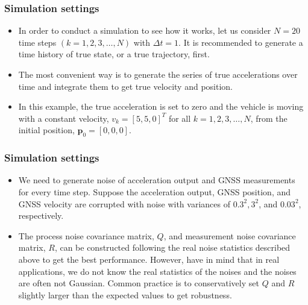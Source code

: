 \documentclass{beamer}
\begin{document}
\begin{frame}
	\frametitle{Simulation settings}
	\begin{itemize}
		\item  In order to conduct a simulation to see how it works, let us consider $N=20$ time steps $(k=1,2,3, \ldots, N)$ with $\Delta t=1$. It is recommended to generate a time history of true state, or a true trajectory, first. 
		\item The most convenient way is to generate the series of true accelerations over time and integrate them to get true velocity and position.
		\item  In this example, the true acceleration is set to zero and the vehicle is moving with a constant velocity, $v_k=[5,5,0]^T$ for all $k=1,2,3, \ldots, N$, from the initial position, $\boldsymbol{p}_0=[0,0,0]$. 
	
	\end{itemize}
\end{frame}

\begin{frame}
	\frametitle{Simulation settings}
	\begin{itemize}
		\item  We need to generate noise of acceleration output and GNSS measurements for every time step. Suppose the acceleration output, GNSS position, and GNSS velocity are corrupted with noise with variances of $0.3^2, 3^2$, and $0.03^2$, respectively. 
		\item The process noise covariance matrix, $Q$, and measurement noise covariance matrix, $R$, can be constructed following the real noise statistics described above to get the best performance. However, have in mind that in real applications, we do not know the real statistics of the noises and the noises are often not Gaussian. Common practice is to conservatively set $Q$ and $R$ slightly larger than the expected values to get robustness.
		
	\end{itemize}
\end{frame}
\end{document}
